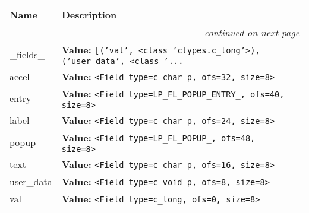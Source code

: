     \vspace{-1cm}
\hspace{\varindent}\begin{longtable}{|p{\varnamewidth}|p{\vardescrwidth}|l}
\cline{1-2}
\cline{1-2} \centering \textbf{Name} & \centering \textbf{Description}& \\
\cline{1-2}
\endhead\cline{1-2}\multicolumn{3}{r}{\small\textit{continued on next page}}\\\endfoot\cline{1-2}
\endlastfoot\raggedright \_\-f\-i\-e\-l\-d\-s\-\_\- & \raggedright \textbf{Value:} 
{\tt \texttt{[}\texttt{(}\texttt{'}\texttt{val}\texttt{'}\texttt{, }{\textless}class 'ctypes.c\_long'{\textgreater}\texttt{)}\texttt{, }\texttt{(}\texttt{'}\texttt{user\_data}\texttt{'}\texttt{, }{\textless}class '\texttt{...}}&\\
\cline{1-2}
\raggedright a\-c\-c\-e\-l\- & \raggedright \textbf{Value:} 
{\tt {\textless}Field type=c\_char\_p, ofs=32, size=8{\textgreater}}&\\
\cline{1-2}
\raggedright e\-n\-t\-r\-y\- & \raggedright \textbf{Value:} 
{\tt {\textless}Field type=LP\_FL\_POPUP\_ENTRY\_, ofs=40, size=8{\textgreater}}&\\
\cline{1-2}
\raggedright l\-a\-b\-e\-l\- & \raggedright \textbf{Value:} 
{\tt {\textless}Field type=c\_char\_p, ofs=24, size=8{\textgreater}}&\\
\cline{1-2}
\raggedright p\-o\-p\-u\-p\- & \raggedright \textbf{Value:} 
{\tt {\textless}Field type=LP\_FL\_POPUP\_, ofs=48, size=8{\textgreater}}&\\
\cline{1-2}
\raggedright t\-e\-x\-t\- & \raggedright \textbf{Value:} 
{\tt {\textless}Field type=c\_char\_p, ofs=16, size=8{\textgreater}}&\\
\cline{1-2}
\raggedright u\-s\-e\-r\-\_\-d\-a\-t\-a\- & \raggedright \textbf{Value:} 
{\tt {\textless}Field type=c\_void\_p, ofs=8, size=8{\textgreater}}&\\
\cline{1-2}
\raggedright v\-a\-l\- & \raggedright \textbf{Value:} 
{\tt {\textless}Field type=c\_long, ofs=0, size=8{\textgreater}}&\\
\cline{1-2}
\end{longtable}



